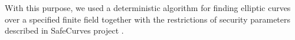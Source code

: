 With this purpose, we used a deterministic algorithm for finding elliptic curves over a specified finite field \cite{generation-baby} together
with the restrictions of security parameters described in SafeCurves project \cite{safe-curves}. %

